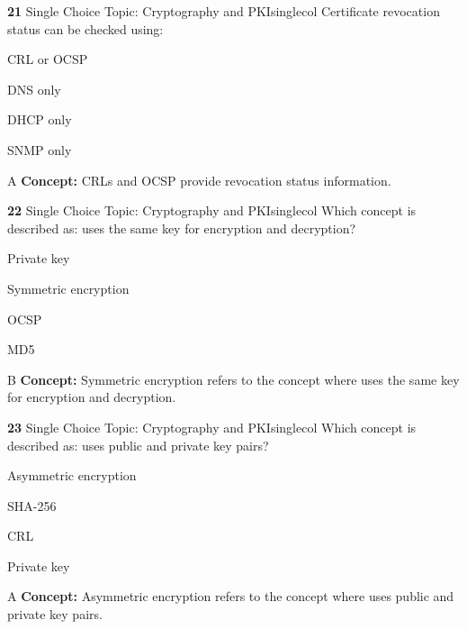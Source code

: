 \documentclass[10pt,a4paper]{article}
\begin{document}
\begin{qcard}{\color{white}\textbf{21} \hfill \small Single Choice \textbar{} Topic: Cryptography and PKI}{singlecol}
Certificate revocation status can be checked using:

\begin{qoptions}
\item CRL or OCSP
\item DNS only
\item DHCP only
\item SNMP only
\end{qoptions}
\begin{explainbox}{A}
\textbf{Concept:} CRLs and OCSP provide revocation status information.
\end{explainbox}
\end{qcard}

\begin{qcard}{\color{white}\textbf{22} \hfill \small Single Choice \textbar{} Topic: Cryptography and PKI}{singlecol}
Which concept is described as: uses the same key for encryption and decryption?

\begin{qoptions}
\item Private key
\item Symmetric encryption
\item OCSP
\item MD5
\end{qoptions}
\begin{explainbox}{B}
\textbf{Concept:} Symmetric encryption refers to the concept where uses the same key for encryption and decryption.
\end{explainbox}
\end{qcard}

\begin{qcard}{\color{white}\textbf{23} \hfill \small Single Choice \textbar{} Topic: Cryptography and PKI}{singlecol}
Which concept is described as: uses public and private key pairs?

\begin{qoptions}
\item Asymmetric encryption
\item SHA-256
\item CRL
\item Private key
\end{qoptions}
\begin{explainbox}{A}
\textbf{Concept:} Asymmetric encryption refers to the concept where uses public and private key pairs.
\end{explainbox}
\end{qcard}
\end{document}
